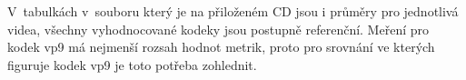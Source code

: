 \documentclass[thesis=M,czech]{FITthesis}[2016/06/26]
\begin{document}

V~tabulkách v~souboru který je na přiloženém CD jsou i průměry pro jednotlivá videa, všechny vyhodnocované kodeky jsou postupně referenční. Meření pro kodek vp9 má nejmenší rozsah hodnot metrik, proto pro srovnání ve kterých figuruje kodek vp9 je toto potřeba zohlednit.
\end{document}
